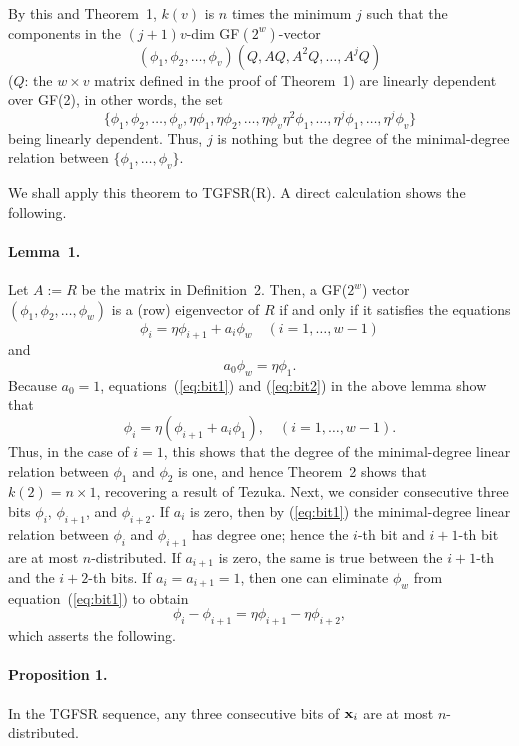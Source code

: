 By this and Theorem~1,
$k(v)$ is $n$ times the minimum $j$
such that the components in the
$(j+1)v$-dim GF$(2^w)$-vector
$$
(\phi_1,\phi_2,\ldots,\phi_v)(Q, AQ, A^2Q, \ldots, A^jQ)
$$
($Q$: the $w\times v$ matrix defined in the proof of Theorem~1)
are linearly dependent over GF(2), in other words,
the set
$$
\{\phi_1,\phi_2,\ldots,\phi_v,\eta\phi_1,\eta\phi_2,\ldots,\eta\phi_v
\eta^2\phi_1,\ldots,\eta^j\phi_1,\ldots, \eta^j\phi_v\}
$$
being linearly dependent.
Thus, $j$ is nothing but the degree of the
minimal-degree relation between $\{\phi_1,\ldots,\phi_v\}$.
\vskip 3mm

We shall apply this theorem to TGFSR(R).
A direct calculation shows the following.
\paragraph{Lemma~1.}
Let $A:=R$ be the matrix in Definition~2.
Then, a GF($2^w$) vector
$(\phi_1,\phi_2,\ldots,\phi_w)$
is a (row) eigenvector of $R$ if and only if it satisfies the equations
\begin{equation}\label{eq:bit1}
\phi_i=\eta\phi_{i+1}+a_i\phi_w \quad (i=1,\ldots,w-1)
\end{equation}
and
\begin{equation}\label{eq:bit2}
a_0\phi_w=\eta\phi_1.
\end{equation}
\vskip 5mm
Because $a_0=1$, equations~(\ref{eq:bit1}) and (\ref{eq:bit2})
in the above lemma
show that
\begin{equation}\label{eq:bit3}
\phi_i=\eta(\phi_{i+1}+a_i\phi_1), \quad (i=1,\ldots,w-1).
\end{equation}
Thus, in the case of $i=1$, this shows 
that the degree of the minimal-degree linear relation
between $\phi_1$ and $\phi_2$ is one, 
and hence Theorem~2 shows that 
$k(2) = n \times 1$, recovering a result of Tezuka\cite{tezuka}.
Next, we consider consecutive three bits
$\phi_i$, $\phi_{i+1}$, and $\phi_{i+2}$.
If $a_i$ is zero, then by (\ref{eq:bit1})
the minimal-degree linear relation between $\phi_{i}$
and $\phi_{i+1}$ has degree one; hence the $i$-th bit and
$i+1$-th bit are at most $n$-distributed.
If $a_{i+1}$ is zero, the same is true between the
$i+1$-th
and the $i+2$-th bits.
If $a_i=a_{i+1}=1$, then one can eliminate $\phi_w$
from equation~(\ref{eq:bit1}) to obtain
$$\phi_i-\phi_{i+1}=\eta\phi_{i+1}-\eta\phi_{i+2},$$
which asserts the following.
\paragraph{Proposition 1.}
In the TGFSR sequence, any three consecutive bits of ${\bf x}_i$ 
are at most
$n$-distributed.
\vskip 3mm

